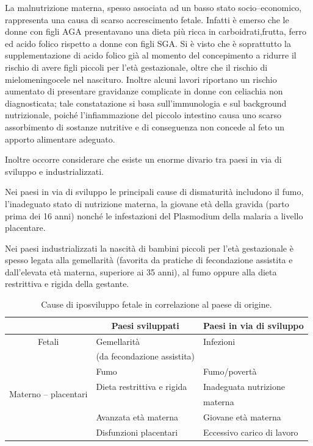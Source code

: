 La malnutrizione materna, spesso associata ad un basso stato socio--economico, rappresenta una causa di scarso accrescimento fetale. 
Infatti \`e emerso che le donne con figli AGA presentavano una dieta più ricca in carboidrati,frutta, ferro ed acido folico rispetto a donne con figli SGA. Si è visto che è soprattutto la supplementazione di acido folico già al momento del concepimento a ridurre il rischio di avere figli piccoli per l'età gestazionale, oltre che il rischio di mielomeningocele nel nascituro.\cite{sga-26}
Inoltre alcuni lavori riportano un rischio aumentato di presentare gravidanze complicate
in donne con celiachia non diagnosticata; tale constatazione si basa sull'immunologia e 
sul background nutrizionale, poich\'e l'infiammazione del piccolo intestino causa uno
scarso assorbimento di sostanze nutritive e di conseguenza non concede al feto un apporto alimentare adeguato\cite{sga-15}.

Inoltre occorre considerare che esiste un enorme divario tra paesi in via di sviluppo e industrializzati.

Nei paesi in via di sviluppo le principali cause di dismaturità includono il fumo, l'inadeguato stato di 
nutrizione materna, la giovane età della gravida (parto prima dei 16 anni) nonché le infestazioni del Plasmodium della malaria a 
livello placentare.

Nei paesi industrializzati la nascità di bambini piccoli per l'età gestazionale
è spesso legata alla gemellarità (favorita da pratiche di fecondazione assistita
e dall'elevata età materna, superiore ai 35 anni), al fumo oppure alla dieta restrittiva e rigida della gestante.

\begin{table}[h]\centering
\begin{tabular}{cll}
\toprule
			& \multicolumn{1}{c}{Paesi sviluppati}			& \multicolumn{1}{c}{Paesi in via di sviluppo} \\
\midrule
Fetali & Gemellarit\`a  			& Infezioni			\\
 & (da fecondazione assistita) & \\\midrule
\multirow{4}{*}{Materno -- placentari} & Fumo						& Fumo/povertà		\\\cmidrule(l){2-3}
			& Dieta restrittiva e rigida	& Inadeguata nutrizione\\
			& &  materna \\\cmidrule(l){2-3}
			& Avanzata età materna  &	Giovane età materna \\\cmidrule(l){2-3}
			& Disfunzioni placentari	& Eccessivo carico di lavoro	\\\bottomrule
\end{tabular}
\label{tab-cause}
\caption{Cause di iposviluppo fetale in correlazione al paese di origine.}
\end{table}

